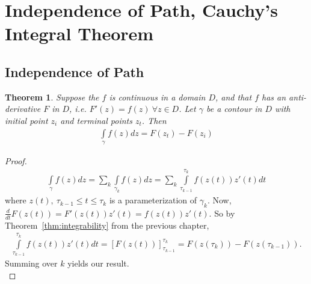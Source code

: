 \documentclass[12pt, a4paper]{article}
\theoremstyle{plain}
\newtheorem{thm}{Theorem} %
\theoremstyle{definition}
\begin{document}
	\section{Independence of Path, Cauchy's Integral Theorem} %
	\label{sec:independence_of_path_cauchy_s_integral_theorem}
		\subsection{Independence of Path} %
		\label{sub:independence_of_path}
			\begin{thm}
				Suppose the $f$ is continuous in a domain $D$, and that $f$ has an anti-derivative $F$ in $D$, i.e. $F'(z) = f(z)\:\forall z\in D$. Let $\gamma$ be a contour in $D$ with initial point $z_i$ and terminal points $z_t$. Then
				\begin{align*}
					\int\limits_{\gamma}f(z)dz = F(z_t)-F(z_i)
				\end{align*}
			\end{thm}

			\begin{proof}
				\begin{align*}
					\int\limits_{\gamma}f(z)dz =
					\sum\limits_{k}\int\limits_{\gamma_k}f(z)dz =
					\sum\limits_k \int\limits_{\tau_{k-1}}^{\tau_k}f(z(t))z'(t) dt
				\end{align*}
				where $z(t),\: \tau_{k-1}\le t\le \tau_k$ is a parameterization of $\gamma_k$. Now, $\frac{d}{dt}F(z(t)) = F'(z(t))z'(t)=f(z(t))z'(t)$. So by Theorem~\ref{thm:integrability} from the previous chapter, 
				\begin{align*}
					\int\limits_{\tau_{k-1}}^{\tau_k}f(z(t))z'(t)dt =
					\left[F(z(t))\right]_{\tau_{k-1}}^{\tau_k} = F(z(\tau_k)) - F(z(\tau_{k-1})).
				\end{align*}
				Summing over $k$ yields our result.\\
			\end{proof}
\end{document}
